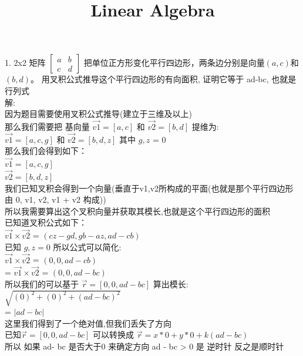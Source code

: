 \documentclass[12pt]{article}
\title{Linear Algebra}
\date{}
\begin{document}
\maketitle


\begin{flushleft}
    1. 2x2 矩阵 $\begin{bmatrix}
            a & b \\
            c & d
        \end{bmatrix}$ 把单位正方形变化平行四边形，两条边分别是向量$(a, c)$和$(b, d)$。
    用叉积公式推导这个平行四边形的有向面积, 证明它等于 ad-bc, 也就是行列式 \\
    解: \\
    因为题目需要使用叉积公式推导(建立于三维及以上) \\
    那么我们需要把 基向量 $\vec{v1} = [a, c]$ 和 $\vec{v2} = [b, d]$ 提维为: \\
    $\vec{v1} = [a, c, g]$ 和 $\vec{v2} = [b, d, z]$  其中 $g,z$ = 0 \\
    那么我们会得到如下： \\
    $\vec{v1} = [a, c, g]$ \\
    $\vec{v2} = [b, d, z]$ \\

    我们已知叉积会得到一个向量(垂直于v1,v2所构成的平面(也就是那个平行四边形由 0, v1, v2, v1 + v2 构成))\\
    所以我需要算出这个叉积向量并获取其模长,也就是这个平行四边形的面积 \\
    已知道叉积公式如下： \\
    $\vec{v1}  \times \vec{v2}$ =  $(cz - gd , gb - az, ad -cb)$ \\
    已知 $g,z = 0$
    所以公式可以简化: \\
    $\vec{v1}  \times \vec{v2}$ =  $(0 , 0, ad -cb)$ \\
    = $\vec{v1}  \times \vec{v2}$ =  $(0 , 0, ad- bc)$ \\
    所以我们的可以基于 $\vec{r} = [0,0,ad -bc]$ 算出模长: \\
    $\sqrt{(0)^{2} + (0)^{2} + (ad- bc)^{2}}$ \\
    = $|ad - bc|$ \\
    这里我们得到了一个绝对值,但我们丢失了方向 \\
    已知$\vec{r} = [0,0,ad -bc]$ 可以转换成 $\vec{r} = x*0 + y*0 + k(ad-bc)$ \\
    所以 如果 ad- bc 是否大于0 来确定方向 ad - bc  > 0 是 逆时针 反之是顺时针
\end{flushleft}
\end{document}
